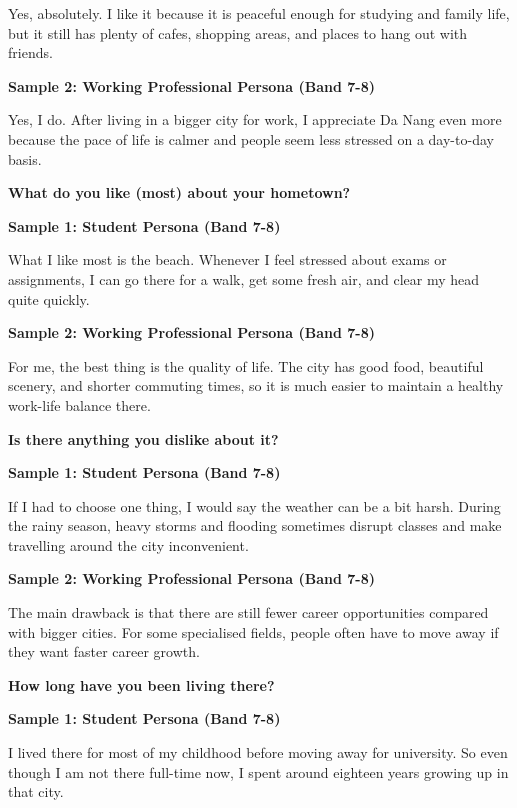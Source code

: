 Yes, absolutely. I like it because it is peaceful enough for studying and family life, but it still has plenty of cafes, shopping areas, and places to hang out with friends.

\textbf{Sample 2: Working Professional Persona (Band 7-8)}

Yes, I do. After living in a bigger city for work, I appreciate Da Nang even more because the pace of life is calmer and people seem less stressed on a day-to-day basis.

\separator

\begin{ieltsquestion}
\textbf{What do you like (most) about your hometown?}
\end{ieltsquestion}
\textbf{Sample 1: Student Persona (Band 7-8)}

What I like most is the beach. Whenever I feel stressed about exams or assignments, I can go there for a walk, get some fresh air, and clear my head quite quickly.

\textbf{Sample 2: Working Professional Persona (Band 7-8)}

For me, the best thing is the quality of life. The city has good food, beautiful scenery, and shorter commuting times, so it is much easier to maintain a healthy work-life balance there.

\separator

\begin{ieltsquestion}
\textbf{Is there anything you dislike about it?}
\end{ieltsquestion}
\textbf{Sample 1: Student Persona (Band 7-8)}

If I had to choose one thing, I would say the weather can be a bit harsh. During the rainy season, heavy storms and flooding sometimes disrupt classes and make travelling around the city inconvenient.

\textbf{Sample 2: Working Professional Persona (Band 7-8)}

The main drawback is that there are still fewer career opportunities compared with bigger cities. For some specialised fields, people often have to move away if they want faster career growth.

\separator

\begin{ieltsquestion}
\textbf{How long have you been living there?}
\end{ieltsquestion}
\textbf{Sample 1: Student Persona (Band 7-8)}

I lived there for most of my childhood before moving away for university. So even though I am not there full-time now, I spent around eighteen years growing up in that city.

